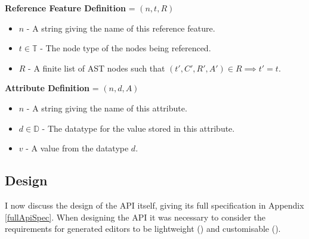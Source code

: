 \documentclass{article}
\begin{document}
%
\textbf{Reference Feature Definition} = $(n,t,R)$ 
\begin{itemize}
\item $n$ - A string giving the name of this reference feature.
\item $t\in \mathbb{T}$ - The node type of the nodes being referenced.
\item $R$ - A finite list of AST nodes such that $(t',C',R',A') \in R \implies t'=t$.
\end{itemize}
%
\textbf{Attribute Definition} = $(n,d,A)$ 
\begin{itemize}
\item $n$ - A string giving the name of this attribute.
\item $d\in \mathbb{D}$ - The datatype for the value stored in this attribute.
\item $v$ - A value from the datatype $d$.
\end{itemize}
%
\subsection{Design}\label{apiDesign}
I now discuss the design of the API itself, giving its full specification in Appendix \ref{fullApiSpec}. When designing the API it was necessary to consider the requirements for generated editors to be lightweight (\RLightweight) and customisable (\RCustom).
\end{document}
